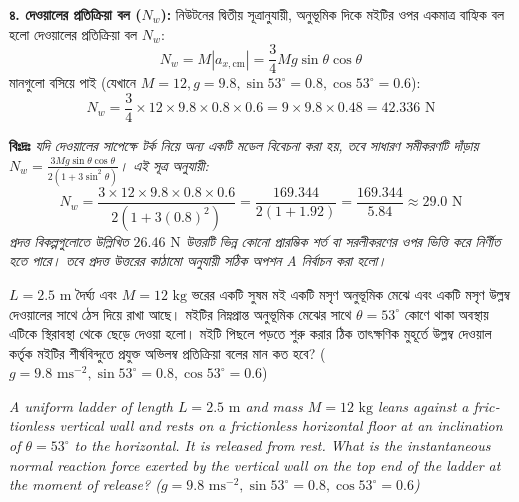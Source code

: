 \documentclass[12pt, a4paper]{article}
\begin{document}
\begin{tcolorbox}[solutionbox={সমাধান (Solution)}]
\vspace{0.5em}
\textbf{৪. দেওয়ালের প্রতিক্রিয়া বল ($N_w$):}
নিউটনের দ্বিতীয় সূত্রানুযায়ী, অনুভূমিক দিকে মইটির ওপর একমাত্র বাহ্যিক বল হলো দেওয়ালের প্রতিক্রিয়া বল $N_w$:
$$N_w = M |a_{x, \text{cm}}| = \frac{3}{4} M g \sin\theta \cos\theta$$
মানগুলো বসিয়ে পাই (যেখানে $M=12, g=9.8, \sin 53^\circ=0.8, \cos 53^\circ=0.6$):
$$N_w = \frac{3}{4} \times 12 \times 9.8 \times 0.8 \times 0.6 = 9 \times 9.8 \times 0.48 = 42.336\text{ N}$$

\vspace{0.5em}
\textbf{বিঃদ্রঃ} \textit{যদি দেওয়ালের সাপেক্ষে টর্ক নিয়ে অন্য একটি মডেল বিবেচনা করা হয়, তবে সাধারণ সমীকরণটি দাঁড়ায় $N_w = \frac{3 M g \sin\theta \cos\theta}{2(1 + 3\sin^2\theta)}$। এই সূত্র অনুযায়ী:
$$N_w = \frac{3 \times 12 \times 9.8 \times 0.8 \times 0.6}{2(1 + 3(0.8)^2)} = \frac{169.344}{2(1 + 1.92)} = \frac{169.344}{5.84} \approx 29.0\text{ N}$$
প্রদত্ত বিকল্পগুলোতে উল্লিখিত $26.46\text{ N}$ উত্তরটি ভিন্ন কোনো প্রারম্ভিক শর্ত বা সরলীকরণের ওপর ভিত্তি করে নির্ণীত হতে পারে। তবে প্রদত্ত উত্তরের কাঠামো অনুযায়ী সঠিক অপশন A নির্বাচন করা হলো।}
\end{tcolorbox}
\vspace{1em}

\begin{tcolorbox}[questionbox={প্রশ্ন (Question) 36}]
\noindent
$L = 2.5\text{ m}$ দৈর্ঘ্য এবং $M = 12\text{ kg}$ ভরের একটি সুষম মই একটি মসৃণ অনুভূমিক মেঝে এবং একটি মসৃণ উল্লম্ব দেওয়ালের সাথে ঠেস দিয়ে রাখা আছে। মইটির নিম্নপ্রান্ত অনুভূমিক মেঝের সাথে $\theta = 53^\circ$ কোণে থাকা অবস্থায় এটিকে স্থিরাবস্থা থেকে ছেড়ে দেওয়া হলো। মইটি পিছলে পড়তে শুরু করার ঠিক তাৎক্ষণিক মুহূর্তে উল্লম্ব দেওয়াল কর্তৃক মইটির শীর্ষবিন্দুতে প্রযুক্ত অভিলম্ব প্রতিক্রিয়া বলের মান কত হবে? ($g = 9.8\text{ ms}^{-2}, \sin 53^\circ = 0.8, \cos 53^\circ = 0.6$)

\vspace{0.8em}
\begin{english}
\noindent\textit{\color{darkgray}
A uniform ladder of length $L = 2.5\text{ m}$ and mass $M = 12\text{ kg}$ leans against a frictionless vertical wall and rests on a frictionless horizontal floor at an inclination of $\theta = 53^\circ$ to the horizontal. It is released from rest. What is the instantaneous normal reaction force exerted by the vertical wall on the top end of the ladder at the moment of release? ($g = 9.8\text{ ms}^{-2}, \sin 53^\circ = 0.8, \cos 53^\circ = 0.6$)
}
\end{english}
\end{tcolorbox}
\end{document}
